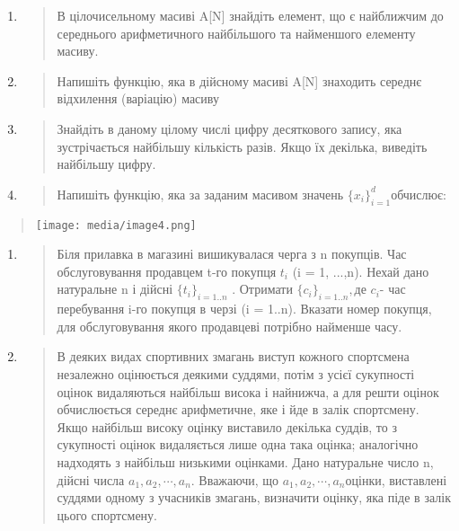 \documentclass[]{article}
\begin{document}
\begin{enumerate}
\def\labelenumi{\arabic{enumi})}
\setcounter{enumi}{12}
\item
  \begin{quote}
  В цілочисельному масиві A{[}N{]} знайдіть елемент, що є найближчим до
  середнього арифметичного найбільшого та найменшого елементу масиву.
  \end{quote}
\item
  \begin{quote}
  Напишіть функцію, яка в дійсному масиві A{[}N{]} знаходить середнє
  відхилення (варіацію) масиву
  \end{quote}
\item
  \begin{quote}
  Знайдіть в даному цілому числі цифру десяткового запису, яка
  зустрічається найбільшу кількість разів. Якщо їх декілька, виведіть
  найбільшу цифру.
  \end{quote}
\item
  \begin{quote}
  Напишіть функцію, яка за заданим масивом значень
  \({\{ x_{i}\}}_{i = 1}^{d}\)обчислює:
  \end{quote}
\end{enumerate}

\begin{quote}
\texttt{[image: media/image4.png]}
\end{quote}

\begin{enumerate}
\def\labelenumi{\arabic{enumi})}
\setcounter{enumi}{12}
\item
  \begin{quote}
  Біля прилавка в магазині вишикувалася черга з n покупців. Час
  обслуговування продавцем t-го покупця \(t_{i}\) (i = 1, ...,n). Нехай
  дано натуральне n і дійсні \({\{ t_{i}\}}_{i = 1..n}\) . Отримати
  \({\{ c_{i}\}}_{i = 1..n},\)де \(c_{i}\)- час перебування i-го покупця
  в черзі (i = 1..n). Вказати номер покупця, для обслуговування якого
  продавцеві потрібно найменше часу.
  \end{quote}
\item
  \begin{quote}
  В деяких видах спортивних змагань виступ кожного спортсмена незалежно
  оцінюється деякими суддями, потім з усієї сукупності оцінок
  видаляються найбільш висока і найнижча, а для решти оцінок
  обчислюється середнє арифметичне, яке і йде в залік спортсмену. Якщо
  найбільш високу оцінку виставило декілька суддів, то з сукупності
  оцінок видаляється лише одна така оцінка; аналогічно надходять з
  найбільш низькими оцінками. Дано натуральне число n, дійсні числа
  \(a_{1},a_{2},\cdots,a_{n}\). Вважаючи, що
  \(a_{1},a_{2},\cdots,a_{n}\)оцінки, виставлені суддями одному з
  учасників змагань, визначити оцінку, яка піде в залік цього
  спортсмену.
  \end{quote}
\end{enumerate}
\end{document}
